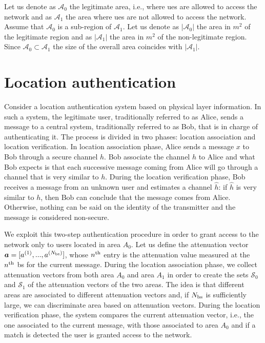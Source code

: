 \documentclass[draftcls,onecolumn,12pt]{IEEEtran}
\begin{document}
Let us denote as $\mathcal{A}_0$ the legitimate area, i.e., where \acp{ue} are allowed to access the network and as $\mathcal{A}_1$ the area where \acp{ue} are not allowed to access the network. Assume that $\mathcal{A}_0$ is a sub-region of $\mathcal{A}_1$. Let us denote as $|\mathcal{A}_{0}|$ the area in $m^2$ of the legitimate region and as $|\mathcal{A}_{1}|$ the area in $m^2$ of the non-legitimate region.
Since $\mathcal{A}_0 \subset \mathcal{A}_1$ the size of the overall area coincides with $|\mathcal{A}_1|$. 

\section{Location authentication}\label{sec:auth}
Consider a location authentication system based on physical layer information. In such a system, the legitimate user, traditionally referred to as Alice, sends a message to a central system, traditionally referred to as Bob, that is in charge of authenticating it. The process is divided in two phases: location association and location verification. In location association phase, Alice sends a message $x$ to Bob through a secure channel $h$. Bob associate the channel $h$ to Alice and what Bob expects is that each successive message coming from Alice will go through a channel that is very similar to $h$. During the location verification phase, Bob receives a message from an unknown user and estimates a channel $\hat{h}$: if $\hat{h}$ is very similar to $h$, then Bob can conclude that the message comes from Alice. Otherwise, nothing can be said on the identity of the transmitter and the message is considered non-secure.

We exploit this two-step authentication procedure in order to grant access to the network only to users located in area $A_0$. Let us define the attenuation vector $\bm{a}=[a^{(1)},...,a^{(N_{\rm bs})}]$, whose $n^{\rm th}$ entry is the attenuation value measured at the $n^{\rm th}$ \ac{bs} for the current message. During the location association phase, we collect attenuation vectors from both area $A_0$ and area $A_1$ in order to create the sets $\mathcal{S}_0$ and $\mathcal{S}_1$ of the attenuation vectors of the two areas. The idea is that different areas are associated to different attenuation vectors and, if $N_{\rm bs}$ is sufficiently large, we can discriminate area based on attenuation vectors. During the location verification phase, the system compares the current attenuation vector, i.e., the one associated to the current message, with those associated to area $A_0$ and if a match is detected the user is granted access to the network.
\end{document}
